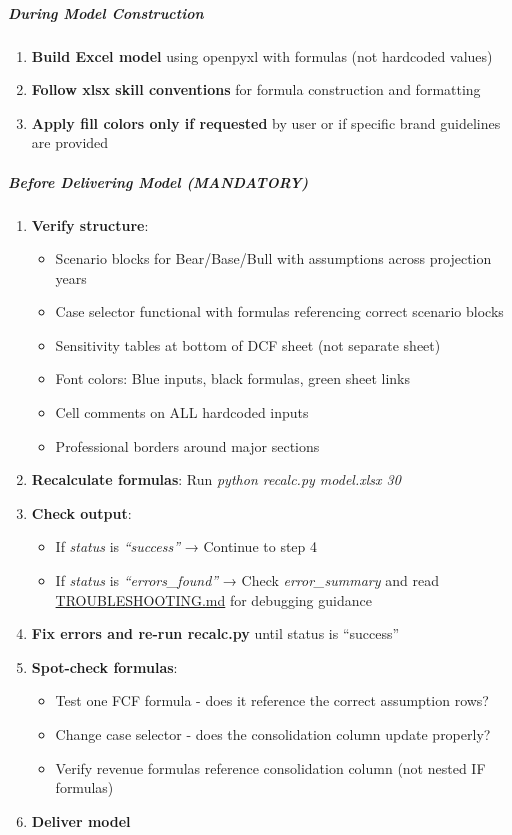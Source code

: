 \documentclass[11pt]{article}
\begin{document}
\subparagraph{During Model Construction}\mbox{}\par

\begin{enumerate}[leftmargin=*,itemsep=2pt,topsep=2pt]
\item {} \textbf{Build Excel model} using openpyxl with formulas (not hardcoded values)
\item {} \textbf{Follow xlsx skill conventions} for formula construction and formatting
\item {} \textbf{Apply fill colors only if requested} by user or if specific brand guidelines are provided
\end{enumerate}

\subparagraph{Before Delivering Model (MANDATORY)}\mbox{}\par

\begin{enumerate}[leftmargin=*,itemsep=2pt,topsep=2pt]
\item {} \textbf{Verify structure}:
\begin{itemize}[leftmargin=*,itemsep=2pt,topsep=2pt]
\item {} Scenario blocks for Bear/Base/Bull with assumptions across projection years
\item {} Case selector functional with formulas referencing correct scenario blocks
\item {} Sensitivity tables at bottom of DCF sheet (not separate sheet)
\item {} Font colors: Blue inputs, black formulas, green sheet links
\item {} Cell comments on ALL hardcoded inputs
\item {} Professional borders around major sections
\end{itemize}
\item {} \textbf{Recalculate formulas}: Run \emph{python recalc.py model.xlsx 30}
\item {} \textbf{Check output}:
\begin{itemize}[leftmargin=*,itemsep=2pt,topsep=2pt]
\item {} If \emph{status} is \emph{``success''} → Continue to step 4
\item {} If \emph{status} is \emph{``errors\_\allowbreak{}found''} → Check \emph{error\_\allowbreak{}summary} and read \href{./TROUBLESHOOTING.md}{TROUBLESHOOTING.md} for debugging guidance
\end{itemize}
\item {} \textbf{Fix errors and re-run recalc.py} until status is ``success''
\item {} \textbf{Spot-check formulas}:
\begin{itemize}[leftmargin=*,itemsep=2pt,topsep=2pt]
\item {} Test one FCF formula - does it reference the correct assumption rows?
\item {} Change case selector - does the consolidation column update properly?
\item {} Verify revenue formulas reference consolidation column (not nested IF formulas)
\end{itemize}
\item {} \textbf{Deliver model}
\end{enumerate}
\end{document}
